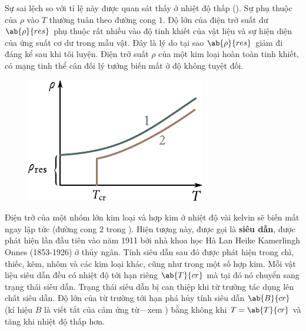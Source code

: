 \noindent
Sự sai lệch so với tỉ lệ này được quan sát thấy ở nhiệt độ thấp (). Sự phụ thuộc của $\rho$ vào $T$ thường tuân theo đường cong $1$. Độ lớn của điện trở suất dư $\ab{\rho}{res}$ phụ thuộc rất nhiều vào độ tinh khiết của vật liệu và sự hiện diện của ứng suất cơ dư trong mẫu vật. Đây là lý do tại sao $\ab{\rho}{res}$ giảm đi đáng kể sau khi tôi luyện. Điện trở suất $\rho$ của một kim loại hoàn toàn tinh khiết, có mạng tinh thể cân đối lý tưởng biến mất ở độ không tuyệt đối.

\begin{figure}[!htb]
	\begin{center}
		\includegraphics[scale=1]{figures/ch_05/fig_5_5.pdf}
		\caption[]{}
		\label{fig:5_5}
	\end{center}
	\vspace{-0.8cm}
\end{figure}

Điện trở của một nhóm lớn kim loại và hợp kim ở nhiệt độ vài kelvin sẽ biến mất ngay lập tức (đường cong $2$ trong ). Hiện tượng này, được gọi là \textbf{siêu dẫn}, được phát hiện lần đầu tiên vào năm 1911 bởi nhà khoa học Hà Lan Heike Kamerlingh Onnes (1853-1926) ở thủy ngân. Tính siêu dẫn sau đó được phát hiện trong chì, thiếc, kẽm, nhôm và các kim loại khác, cũng như trong một số hợp kim. Mỗi vật liệu siêu dẫn đều có nhiệt độ tới hạn riêng $\ab{T}{cr}$ mà tại đó nó chuyển sang trạng thái siêu dẫn. Trạng thái siêu dẫn bị can thiệp khi từ trường tác dụng lên chất siêu dẫn. Độ lớn của từ trường tới hạn phá hủy tính siêu dẫn $\ab{B}{cr}$ (kí hiệu $B$ là viết tắt của cảm ứng từ---xem ) bằng không khi $T=\ab{T}{cr}$ và tăng khi nhiệt độ thấp hơn.

